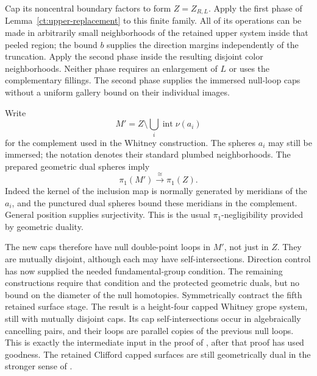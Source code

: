 \documentclass[11pt]{article}
\theoremstyle{definition}
\theoremstyle{remark}
\begin{document}
Cap its noncentral boundary factors to form $Z=Z_{R,L}$. Apply the
first phase of
Lemma~\ref{ct:upper-replacement} to this finite family. All of its
operations can be made in arbitrarily small neighborhoods of the
retained upper system inside that peeled region; the bound $b$ supplies
the direction
margins independently of the truncation. Apply the second phase inside
the resulting disjoint color neighborhoods. Neither phase requires
an enlargement of $L$ or uses the complementary fillings. The second
phase supplies the immersed null-loop caps without a uniform gallery
bound on their individual images.

Write
\[
                  M'=Z\setminus\bigcup_i\operatorname{int}\nu(a_i)
\]
for the complement used in the Whitney construction.  The spheres
$a_i$ may still be immersed; the notation denotes their standard
plumbed neighborhoods.  The prepared geometric dual spheres imply
\begin{equation}\label{ct:complement-group}
                   \pi_1(M')\xrightarrow{\ \cong\ }\pi_1(Z).
\end{equation}
Indeed the kernel of the inclusion map is normally generated by
meridians of the $a_i$, and the punctured dual spheres bound these
meridians in the complement.  General position supplies surjectivity.
This is the usual $\pi_1$-negligibility provided by geometric duality.

The new caps therefore have null double-point loops in $M'$, not
just in $Z$.  They are mutually disjoint, although each may have
self-intersections. Direction control has now supplied the needed
fundamental-group condition. The remaining constructions require that
condition and the protected geometric duals, but no bound on the
diameter of the null homotopies. Symmetrically contract the fifth retained
surface stage.  The result is a height-four capped Whitney grope
system, still with mutually disjoint caps.  Its cap
self-intersections occur in algebraically cancelling pairs, and
their loops are parallel copies of the previous null loops.  This
is exactly the intermediate input in the proof of
\cite[Lemma~4.2]{PRT}, after that proof has used goodness.  The
retained Clifford capped surfaces are still geometrically dual in
the stronger sense of \cite[Definition~3.1]{PRT}.
\end{document}
